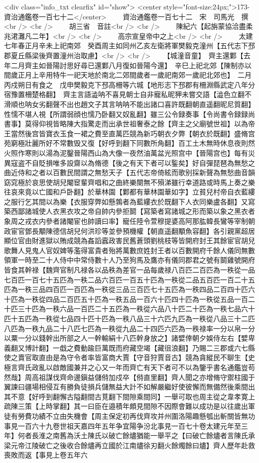 <div class="info_txt clearfix" id="show">
<center style="font-size:24px;">173-資治通鑑卷一百七十二</center>
  　　資治通鑑卷一百七十二　宋　司馬光　撰<br />
<br />
　　胡三省　音註<br />
<br />
　　陳紀六【起旃蒙協洽盡柔兆涒灘凡二年】<br />
<br />
　　高宗宣皇帝中之上<br />
<br />
　　太建七年春正月辛未上祀南郊　癸酉周主如同州乙亥左衛將軍樊毅克潼州【五代志下邳郡夏丘縣梁後齊置潼州治取慮】<br />
<br />
　　【城潼音童】　齊主還鄴【去年二月齊主如晉陽討思好尋已還鄴八月復如晉陽今還】　辛巳上祀北郊【陳制亦以間歲正月上辛用特牛一祀天地於南北二郊間歲者一歲祀南郊一歲祀北郊也】　二月丙戍朔日有食之　戊申樊毅克下邳高柵等六城【地形志下邳郡有柵淵縣武定八年分宿豫置柵楚格翻】　齊主言語澁呐不喜見朝士自非寵私昵狎未嘗交語【澁色立翻不滑順也呐女劣翻聲不出也趙文子其言呐呐不能出諸口喜許既翻朝直遥翻昵尼質翻】性懦不堪人視【所謂弱顔也懦乃卧翻又奴亂翻】雖三公令録奏事【令尚書令録録尚書事】莫得仰視皆略陳大指驚走而出承世祖奢泰之餘【齊主之父廟號世祖】以為帝王當然後宫皆寶衣玉食一裙之費至直萬匹競為新巧朝衣夕弊【朝衣於既翻】盛脩宫苑窮極壯麗所好不常數毁又復【好呼到翻下同數所角翻】百工土木無時休息夜則然火照作寒則以湯為泥鑿晉陽西山為大像一夜然油萬盆光照宫中【晉陽宫也】每有災異寇盗不自貶損唯多設齋以為脩德【後之有天下者可以鍳矣】好自彈琵琶為無愁之曲近侍和之者以百數民間謂之無愁天子【五代志帝倚絃而歌别採新聲為無愁曲音韻窈窕極於哀思使胡兒閹䆠輩齊唱和之曲終樂闋無不殞涕雖行幸道路或時馬上奏之樂往哀來竟以亡國和戶卧翻】於華林園【鄴都有華林園華如字】立貧兒村帝自衣藍縷之服行乞其間以為樂【衣服穿弊如懸鶉者為藍縷衣於既翻下人衣同樂盧各翻】又寫築西鄙諸城使人衣黑衣攻之帝自帥内參拒鬬【寫築者寫諸城之形而築以象之黑衣者象周之戎衣内參者諸閹宦也帥讀曰率】寵任陸令萱穆提婆高阿那肱韓長鸞等宰制朝政宦官鄧長顒陳德信胡兒何洪珍等並參預機權【朝直遥翻顒魚容翻】各引親黨超居顯位官由財進獄以賄成競為姦謟蠧政害民舊蒼頭劉桃枝等皆開府封王其餘宦官胡兒歌舞人見鬼人官奴婢等濫得富貴者殆將萬數庶姓封王者以百數開府千餘人儀同無數領軍一時至二十人侍中中常侍數十人乃至狗馬及鷹亦有儀同郡君之號有鬬雞號開府皆食其幹禄【魏齊官制凡禄各以品秩為差官一品每歲禄八百匹二百匹為一秩從一品七百匹一百七十五匹為一秩二品六百匹一百五十匹為一秩從二品五百匹一百二十五匹為一秩三品四百匹一百匹為一秩從三品三百匹七十五匹為一秩四品二百四十匹六十匹為一秩從四品二百匹五十匹為一秩五品一百六十匹四十匹為一秩從五品一百二十匹三十匹為一秩六品一百匹二十五匹為一秩從六品八十匹二十匹為一秩七品六十匹十五匹為一秩從七品四十匹十匹為一秩八品三十六匹九匹為一秩從八品三十二匹八匹為一秩九品二十八匹七匹為一秩從九品二十四匹六匹為一秩禄率一分以帛一分以粟一分以錢幹出所部之人一幹輸絹十八匹幹身放之】諸嬖倖朝夕娛侍左右【嬖卑義翻又博計翻】一戱之費動踰巨萬既而府藏空竭【藏徂浪翻】乃賜二三郡或六七縣使之賣官取直由是為守令者率皆富商大賈【守音狩賈音古】競為貪縱民不聊生【史極言齊氏政亂以啟敵國兼并之心又一年而齊亡有天下者可不以為鑒乎書名通鑑豈苟然哉】周高祖謀伐齊命邊鎭益儲偫加戍卒【偫直里翻】齊人聞之亦增脩守禦柱國于翼諫曰疆場相侵互有勝負徒損兵儲無益大計不如解嚴繼好使彼懈而無備然後乘間出其不意【好呼到翻懈古隘翻間古莧翻下間隙乘間同】一舉可取也周主從之韋孝寛上疏陳三策【上時掌翻】其一曰臣在邉積年頗見間隙不因際會難以成功是以往歲出軍徒有勞費功績不立由失機會【周主保定初再伐齊攻并州圍洛陽趣懸瓠出斬關皆無功事見一百六十九卷世祖天嘉四年五年争宜陽争汾北事見一百七十卷太建元年至三年】何者長淮之南舊為沃土陳氏以破亡餘燼猶能一舉平之【曰破亡餘燼者言陳氏承梁元帝江陵破亡之後收合餘燼再立國於江南燼徐刃翻火餘燭餘曰燼】齊人歷年赴救喪敗而返【事見上卷五年六